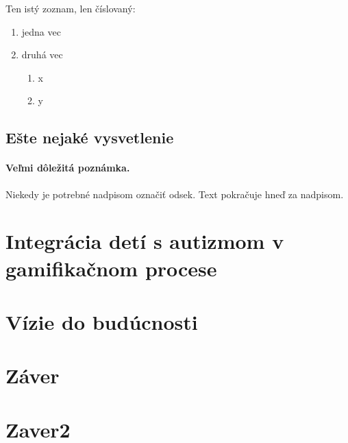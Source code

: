 \documentclass[10pt,twoside,slovak,a4paper]{coursepaper}
\begin{document}
Ten istý zoznam, len číslovaný:

\begin{enumerate}
\item jedna vec
\item druhá vec
	\begin{enumerate}
	\item x
	\item y
	\end{enumerate}
\end{enumerate}


\subsection{Ešte nejaké vysvetlenie} \label{ina:este}

\paragraph{Veľmi dôležitá poznámka.}
Niekedy je potrebné nadpisom označiť odsek. Text pokračuje hneď za nadpisom.



\section{Integrácia detí s autizmom v gamifikačnom procese} \label{Integrácia detí s autizmom v gamifikačnom procese}




\section{Vízie do budúcnosti} \label{Vízie do budúcnosti}




\section{Záver} \label{zaver} %



\section{Zaver2} \label{zaver 2}







\end{document}
